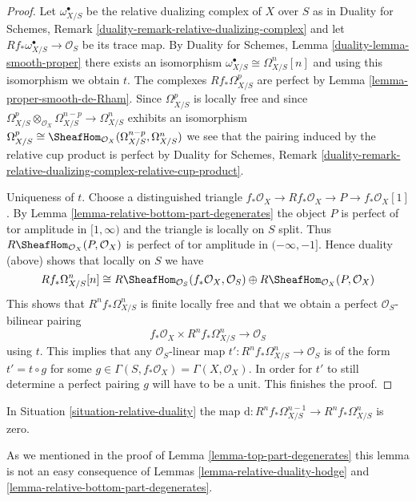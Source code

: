 \begin{proof}
Let $\omega^\bullet_{X/S}$ be the relative dualizing complex of $X$ over $S$ as
in Duality for Schemes, Remark \ref{duality-remark-relative-dualizing-complex}
and let $Rf_*\omega_{X/S}^\bullet \to \mathcal{O}_S$ be its trace map. By
Duality for Schemes, Lemma \ref{duality-lemma-smooth-proper}
there exists an isomorphism $\omega^\bullet_{X/S} \cong \Omega^n_{X/S}[n]$
and using this isomorphism we obtain $t$. The complexes $Rf_*\Omega^p_{X/S}$
are perfect by Lemma \ref{lemma-proper-smooth-de-Rham}.
Since $\Omega^p_{X/S}$ is locally free and since
$\Omega^p_{X/S} \otimes_{\mathcal{O}_X} \Omega^{n - p}_{X/S} \to
\Omega^n_{X/S}$ exhibits an isomorphism $\Omega^p_{X/S} \cong
\SheafHom_{\mathcal{O}_X}(\Omega^{n - p}_{X/S}, \Omega^n_{X/S})$
we see that the pairing induced by the relative cup product is perfect by
Duality for Schemes, Remark
\ref{duality-remark-relative-dualizing-complex-relative-cup-product}.

\medskip\noindent
Uniqueness of $t$. Choose a distinguished triangle
$f_*\mathcal{O}_X \to Rf_*\mathcal{O}_X \to P \to f_*\mathcal{O}_X[1]$.
By Lemma \ref{lemma-relative-bottom-part-degenerates}
the object $P$ is perfect of tor amplitude in $[1, \infty)$
and the triangle is locally on $S$ split.
Thus $R\SheafHom_{\mathcal{O}_X}(P, \mathcal{O}_X)$ is perfect
of tor amplitude in $(-\infty, -1]$. Hence duality (above) shows that
locally on $S$ we have
$$
Rf_*\Omega^n_{X/S}[n] \cong
R\SheafHom_{\mathcal{O}_S}(f_*\mathcal{O}_X, \mathcal{O}_S)
\oplus R\SheafHom_{\mathcal{O}_X}(P, \mathcal{O}_X)
$$
This shows that $R^nf_*\Omega^n_{X/S}$ is finite locally free and
that we obtain a perfect $\mathcal{O}_S$-bilinear pairing
$$
f_*\mathcal{O}_X \times R^nf_*\Omega^n_{X/S} \longrightarrow \mathcal{O}_S
$$
using $t$.
This implies that any $\mathcal{O}_S$-linear map
$t' : R^nf_*\Omega^n_{X/S} \to \mathcal{O}_S$ is of the form
$t' = t \circ g$ for some
$g \in \Gamma(S, f_*\mathcal{O}_X) = \Gamma(X, \mathcal{O}_X)$.
In order for $t'$ to still determine a perfect pairing $g$ will have
to be a unit. This finishes the proof.
\end{proof}

\begin{lemma}
\label{lemma-relative-top-part-degenerates}
In Situation \ref{situation-relative-duality} the map
$\text{d} : R^nf_*\Omega^{n - 1}_{X/S} \to R^nf_*\Omega^n_{X/S}$
is zero.
\end{lemma}

\noindent
As we mentioned in the proof of Lemma \ref{lemma-top-part-degenerates}
this lemma is not an easy consequence of Lemmas
\ref{lemma-relative-duality-hodge} and
\ref{lemma-relative-bottom-part-degenerates}.

